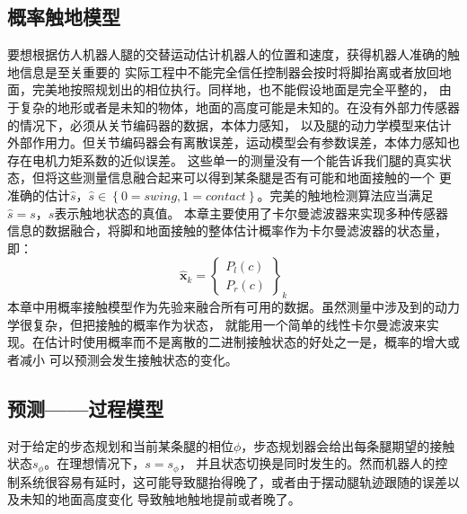 \subsection{概率触地模型}
要想根据仿人机器人腿的交替运动估计机器人的位置和速度，获得机器人准确的触地信息是至关重要的
实际工程中不能完全信任控制器会按时将脚抬离或者放回地面，完美地按照规划出的相位执行。同样地，也不能假设地面是完全平整的，
由于复杂的地形或者是未知的物体，地面的高度可能是未知的。在没有外部力传感器的情况下，必须从关节编码器的数据，本体力感知，
以及腿的动力学模型来估计外部作用力。但关节编码器会有离散误差，运动模型会有参数误差，本体力感知也存在电机力矩系数的近似误差。
这些单一的测量没有一个能告诉我们腿的真实状态，但将这些测量信息融合起来可以得到某条腿是否有可能和地面接触的一个
更准确的估计$\hat s$，$\hat s \in \left\{0=swing, 1=contact\right\}$。完美的触地检测算法应当满足$\hat s = s$，$s$表示触地状态的真值。
本章主要使用了卡尔曼滤波器来实现多种传感器信息的数据融合，将脚和地面接触的整体估计概率作为卡尔曼滤波器的状态量，即：
\begin{equation}
    \label{equ:est_state}
    \hat{\boldsymbol{x}}_k=\left\{\begin{array}{c}
        P_l(c) \\
        P_r(c)
        \end{array}\right\}_k
\end{equation}
本章中用概率接触模型作为先验来融合所有可用的数据。虽然测量中涉及到的动力学很复杂，但把接触的概率作为状态，
就能用一个简单的线性卡尔曼滤波来实现。在估计时使用概率而不是离散的二进制接触状态的好处之一是，概率的增大或者减小
可以预测会发生接触状态的变化。
\subsection{预测——过程模型}

对于给定的步态规划和当前某条腿的相位$\phi$，步态规划器会给出每条腿期望的接触状态$s_{\phi}$。在理想情况下，$s = s_{\phi}$，
并且状态切换是同时发生的。然而机器人的控制系统很容易有延时，这可能导致腿抬得晚了，或者由于摆动腿轨迹跟随的误差以及未知的地面高度变化
导致触地触地提前或者晚了。

